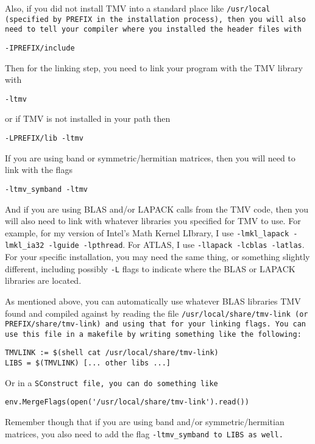 Also, if you did not install TMV into a standard place like \tt{/usr/local} (specified
by \tt{PREFIX} in the installation process), then you will also
need to tell your compiler where you installed the header files with
\begin{verbatim}
-IPREFIX/include
\end{verbatim}

Then for the linking step, you need to link your program with the TMV
library with
\begin{verbatim}
-ltmv
\end{verbatim}
or if TMV is not installed in your path then
\begin{verbatim}
-LPREFIX/lib -ltmv
\end{verbatim}
If you are using band or symmetric/hermitian matrices, then you will
need to link with the flags
\begin{verbatim}
-ltmv_symband -ltmv
\end{verbatim}

And if you are using BLAS and/or LAPACK calls from the TMV code,
then you will also need to
link with whatever libraries you specified for TMV to use.
For example, for my version of Intel's Math Kernel LIbrary, I use
\texttt{-lmkl\_lapack -lmkl\_ia32 -lguide -lpthread}.
For ATLAS,
I use \texttt{-llapack -lcblas -latlas}.  For your specific installation, you may need
the same thing, or something slightly different, including possibly
\texttt{-L} flags to indicate where the BLAS or LAPACK libraries are located.

As mentioned above, 
you can automatically use whatever BLAS libraries
TMV found and compiled against by reading the file
\tt{/usr/local/share/tmv-link} (or \tt{PREFIX/share/tmv-link}) and using that
for your linking flags.  
You can use this file in a \tt{makefile} by writing 
something like the following:
\begin{verbatim}
TMVLINK := $(shell cat /usr/local/share/tmv-link)
LIBS = $(TMVLINK) [... other libs ...]
\end{verbatim}
Or in a \tt{SConstruct} file, you can do something like
\begin{verbatim}
env.MergeFlags(open('/usr/local/share/tmv-link').read())
\end{verbatim}
Remember though that if you are using band and/or symmetric/hermitian matrices, you
also need to add the flag \tt{-ltmv\_symband} to \tt{LIBS} as well.

